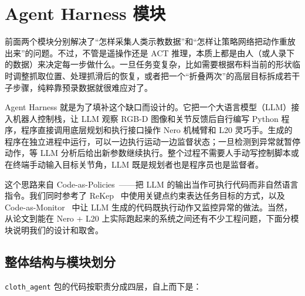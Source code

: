 %
%

\section{Agent Harness 模块}
\label{sec:agent-harness}

前面两个模块分别解决了``怎样采集人类示教数据''和``怎样让策略网络把动作重放出来''的问题。不过，不管是遥操作还是 ACT 推理，本质上都是由人（或人录下的数据）来决定每一步做什么。一旦任务变复杂，比如需要根据布料当前的形状临时调整抓取位置、处理抓滑后的恢复，或者把一个``折叠两次''的高层目标拆成若干子步骤，纯粹靠预录数据就很难应对了。

Agent Harness 就是为了填补这个缺口而设计的。它把一个大语言模型（LLM）接入机器人控制栈，让 LLM 观察 RGB-D 图像和关节反馈后自行编写 Python 程序，程序直接调用底层规划和执行接口操作 Nero 机械臂和 L20 灵巧手。生成的程序在独立进程中运行，可以一边执行运动一边监督状态；一旦检测到异常就暂停动作，等 LLM 分析后给出新参数继续执行。整个过程不需要人手动写控制脚本或在终端手动输入目标关节角，LLM 既是规划者也是程序员也是监督者。

这个思路来自 Code-as-Policies~\cite{liang2023code}——把 LLM 的输出当作可执行代码而非自然语言指令。我们同时参考了 ReKep~\cite{huang2024rekep} 中使用关键点约束表达任务目标的方式，以及 Code-as-Monitor~\cite{zhou2024code} 中让 LLM 生成的代码既执行动作又监控异常的做法。当然，从论文到能在 Nero + L20 上实际跑起来的系统之间还有不少工程问题，下面分模块说明我们的设计和取舍。


\subsection{整体结构与模块划分}
\label{subsec:agent-arch}

\texttt{cloth\_agent} 包的代码按职责分成四层，自上而下是：


